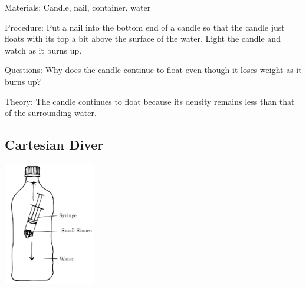 \begin{multicols}{2}
\begin{description*}
\item[Materials:]{Candle, nail, container, water}
\item[Procedure:]{Put a nail into the bottom end of a candle so that the candle just floats with its top a bit above the surface of the water. Light the candle and watch as it burns up.}
\item[Questions:]{Why does the candle continue to float even though it loses weight as it burns up?}
\item[Theory:]{The candle continues to float because its density remains less than that of the surrounding water.}
\end{description*}

\vfill

\subsection{Cartesian Diver}

\begin{center}
\includegraphics[width=0.3\textwidth]{./img/cartesian-diver.png}
\end{center}


\end{multicols}
